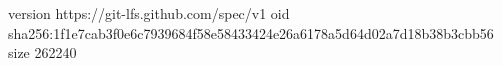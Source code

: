 version https://git-lfs.github.com/spec/v1
oid sha256:1f1e7cab3f0e6c7939684f58e58433424e26a6178a5d64d02a7d18b38b3cbb56
size 262240
